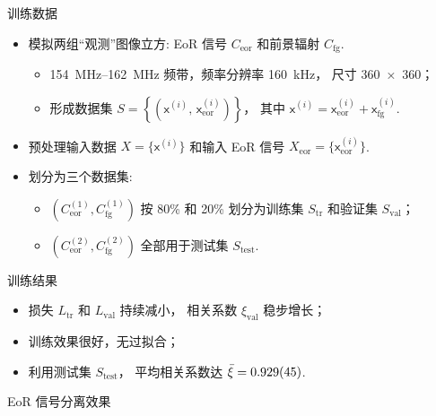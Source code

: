 \documentclass{beamer}
\newcommand{\R}[1]{\text{#1}}  %
\newcommand{\B}[1]{\bm{\mathsf{#1}}}  %
\begin{document}
\begin{frame}{训练数据}
  \begin{itemize}
    \item 模拟两组\enquote{观测}图像立方:
      EoR 信号 $C_{\R{eor}}$ 和前景辐射 $C_{\R{fg}}$.
      \begin{itemize}
        \item \SIrange{154}{162}{\MHz} 频带，频率分辨率 \SI{160}{\kHz}，
          尺寸 \num{360 x 360}；
        \item 形成数据集 $S = \left\{ \left(\B{x}^{(i)},
          \,\B{x}^{(i)}_{\R{eor}} \right) \right\}$，
          其中 $\B{x}^{(i)} = \B{x}^{(i)}_{\R{eor}} + \B{x}^{(i)}_{\R{fg}}$.
      \end{itemize}
    \item 预处理输入数据 $X = \big\{ \B{x}^{(i)} \big\}$
      和输入 EoR 信号 $X_{\R{eor}} = \big\{ \B{x}^{(i)}_{\R{eor}} \big\}$.
    \item 划分为三个数据集:
      \begin{itemize}
        \item $\left( C_{\R{eor}}^{(1)}, C_{\R{fg}}^{(1)} \right)$
          按 80\% 和 20\% 划分为训练集 $S_{\R{tr}}$ 和验证集 $S_{\R{val}}$；
        \item $\left( C_{\R{eor}}^{(2)}, C_{\R{fg}}^{(2)} \right)$
          全部用于测试集 $S_{\R{test}}$.
      \end{itemize}
  \end{itemize}
\end{frame}

\begin{frame}{训练结果}
  \begin{itemize}
    \item 损失 $L_{\R{tr}}$ 和 $L_{\R{val}}$ 持续减小，
      相关系数 $\xi_{\R{val}}$ 稳步增长；
    \item 训练效果很好，无过拟合；
    \item 利用测试集 $S_{\R{test}}$，
      平均相关系数达 $\bar{\xi} = \num{0.929 +- 0.045}$.
  \end{itemize}

  \vspace{-1ex}
\end{frame}

\begin{frame}{EoR 信号分离效果}
  \vspace{-1ex}
\end{frame}
\end{document}

